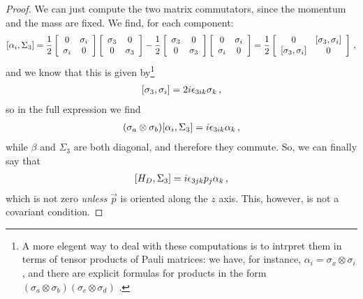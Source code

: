 \documentclass[main.tex]{subfiles}
\begin{document}
\begin{proof}
We can just compute the two matrix commutators, since the momentum and the mass are fixed. We find, for each component:
%
\begin{align}
\qty[\alpha_{i}, \Sigma_{3}] = 
\frac{1}{2}
\left[\begin{array}{cc}
0 & \sigma_{i} \\ 
\sigma_{i} & 0
\end{array}\right]
\left[\begin{array}{cc}
\sigma_3  & 0 \\ 
0 & \sigma_3 
\end{array}\right] 
- \frac{1}{2} 
\left[\begin{array}{cc}
\sigma_3  & 0 \\ 
0 & \sigma_3 
\end{array}\right]
\left[\begin{array}{cc}
0 & \sigma_{i} \\ 
\sigma_{i} & 0
\end{array}\right]
=  \frac{1}{2}
\left[\begin{array}{cc}
0 & \qty[\sigma_3, \sigma_{i}] \\ 
\qty[\sigma_3, \sigma_{i}] & 0
\end{array}\right]
\,,
\end{align}
%
and we know that this is given by\footnote{A more elegent way to deal with these computations is to intrpret them in terms of tensor products of Pauli matrices: we have, for instance, \(\alpha_{i} = \sigma_{x} \otimes \sigma_{i}\), and there are explicit formulas for products in the form \((\sigma_{a } \otimes \sigma_{b})(\sigma_{c } \otimes \sigma_{d}) \) \cite[]{agartthaCommutatorsTensorProduct2018}.}
%
\begin{align}
\qty[\sigma_{3}, \sigma_{i}] = 2i \epsilon_{3ik} \sigma_{k} 
\,,
\end{align}
%
so in the full expression we find 
%
\begin{align}(\sigma_{a } \otimes \sigma_{b})
\qty[\alpha_{i}, \Sigma_3]
=
i \epsilon_{3ik} \alpha_{k}
\,,
\end{align}
%
while \(\beta \) and \(\Sigma_3 \) are both diagonal, and therefore they commute. So, we can finally say that 
%
\begin{align} \label{eq:spin-conservation-dirac}
\qty[H_D, \Sigma_3 ] = i \epsilon_{3jk} p_{j} \alpha_{k} 
\,,
\end{align}
%
which is not zero \emph{unless} \(\vec{p}\) is oriented along the \(z\) axis.
This, however, is not a covariant condition. 
\end{proof}
\end{document}
